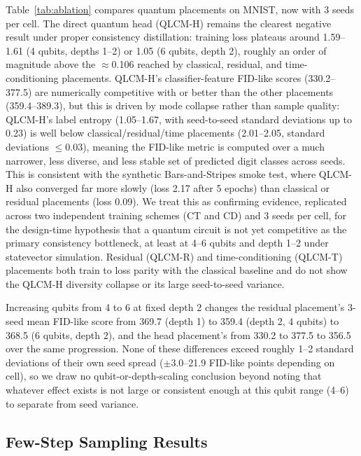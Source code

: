 \documentclass[11pt]{article}
\begin{document}
Table~\ref{tab:ablation} compares quantum placements on MNIST, now with 3
seeds per cell. The direct quantum head (QLCM-H) remains the clearest
negative result under proper consistency distillation: training loss
plateaus around 1.59--1.61 (4 qubits, depths 1--2) or 1.05 (6 qubits, depth
2), roughly an order of magnitude above the $\approx$0.106 reached by
classical, residual, and time-conditioning placements. QLCM-H's
classifier-feature FID-like scores (330.2--377.5) are numerically competitive
with or better than the other placements (359.4--389.3), but this is driven
by mode collapse rather than sample quality: QLCM-H's label entropy
(1.05--1.67, with seed-to-seed standard deviations up to 0.23) is well below
classical/residual/time placements (2.01--2.05, standard deviations
$\le$0.03), meaning the FID-like metric is computed over a much narrower,
less diverse, and less stable set of predicted digit classes across seeds.
This is consistent with the synthetic Bars-and-Stripes smoke test, where
QLCM-H also converged far more slowly (loss 2.17 after 5 epochs) than
classical or residual placements (loss 0.09). We treat this as confirming
evidence, replicated across two independent training schemes (CT and CD) and
3 seeds per cell, for the design-time hypothesis that a quantum circuit is
not yet competitive as the primary consistency bottleneck, at least at 4--6
qubits and depth 1--2 under statevector simulation. Residual (QLCM-R) and
time-conditioning (QLCM-T) placements both train to loss parity with the
classical baseline and do not show the QLCM-H diversity collapse or its
large seed-to-seed variance.

Increasing qubits from 4 to 6 at fixed depth 2 changes the residual
placement's 3-seed mean FID-like score from 369.7 (depth 1) to 359.4 (depth
2, 4 qubits) to 368.5 (6 qubits, depth 2), and the head placement's from
330.2 to 377.5 to 356.5 over the same progression. None of these differences
exceed roughly 1--2 standard deviations of their own seed spread
($\pm$3.0--21.9 FID-like points depending on cell), so we draw no
qubit-or-depth-scaling conclusion beyond noting that whatever effect exists
is not large or consistent enough at this qubit range (4--6) to separate from
seed variance.

\subsection{Few-Step Sampling Results}
\label{sec:few-step-results}
\end{document}
